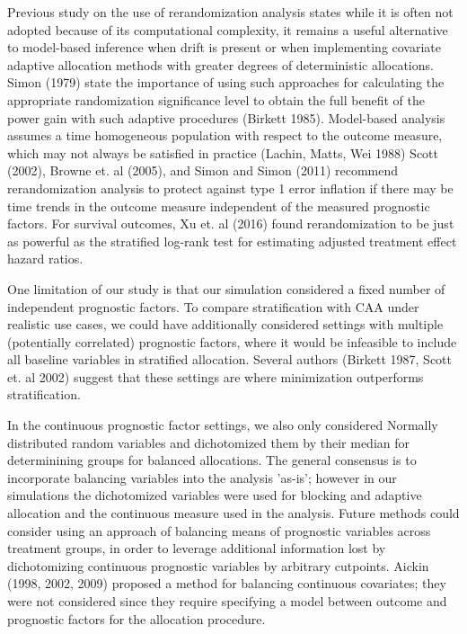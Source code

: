 Previous study on the use of rerandomization analysis states while it is often not adopted because of its computational complexity, it remains a useful alternative to model-based inference when drift is present or when implementing covariate adaptive allocation methods with greater degrees of deterministic allocations.
Simon (1979) state the importance of using such approaches for calculating the appropriate randomization significance level to obtain the full benefit of the power gain with such adaptive procedures (Birkett 1985).
Model-based analysis assumes a time homogeneous population with respect to the outcome measure, which may not always be satisfied in practice (Lachin, Matts, Wei 1988)
Scott (2002), Browne et. al (2005), and Simon and Simon (2011) recommend rerandomization analysis to protect against type 1 error inflation if there may be time trends in the outcome measure independent of the measured prognostic factors.
For survival outcomes, Xu et. al (2016) found rerandomization to be just as powerful as the stratified log-rank test for estimating adjusted treatment effect hazard ratios.

One limitation of our study is that our simulation considered a fixed number of independent prognostic factors.
To compare stratification with CAA under realistic use cases, we could have additionally considered settings with multiple (potentially correlated) prognostic factors, where it would be infeasible to include all baseline variables in stratified allocation.  
Several authors (Birkett 1987, Scott et. al 2002) suggest that these settings are where minimization outperforms stratification.

In the continuous prognostic factor settings, we also only considered Normally distributed random variables and dichotomized them by their median for determinining groups for balanced allocations.
The general consensus is to incorporate balancing variables into the analysis 'as-is'; however in our simulations the dichotomized variables were used for blocking and adaptive allocation and the continuous measure used in the analysis.
Future methods could consider using an approach of balancing means of prognostic variables across treatment groups, in order to leverage additional information lost by dichotomizing continuous prognostic variables by arbitrary cutpoints.
Aickin (1998, 2002, 2009) proposed a method for balancing continuous covariates; they were not considered since they require specifying a model between outcome and prognostic factors for the allocation procedure.

